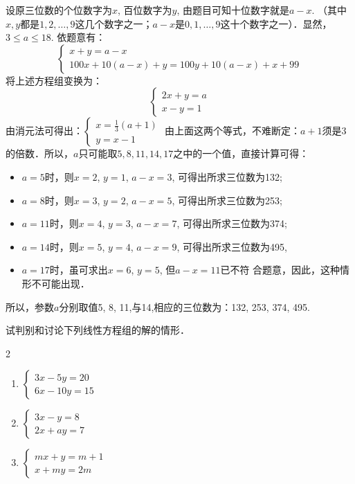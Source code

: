 \begin{solution}
设原三位数的个位数字为$x$, 百位数字为$y$, 由题目可知十位数字就是$a-x$. （其中$x,y$都是$1, 2,\ldots,9$这几个数字之一；$a-x$是$0, 1,\ldots,9$这十个数字之一）．显然，$3\le a\le 18$. 依题意有：
\[\begin{cases}
    x+y=a-x\\
    100x+10(a-x)+y=100y+10(a-x)+x+99
\end{cases}\]
将上述方程组变换为：
\[\begin{cases}
    2x+y=a\\x-y=1
\end{cases}\]
由消元法可得出：$\begin{cases}
    x=\frac{1}{3}(a+1)\\ y=x-1
\end{cases}$
由上面这两个等式，不难断定：$a+1$须是3的倍数．所以，$a$只可能取$5, 8, 11, 14, 17$之中的一个值，直接计算可得：
\begin{itemize}
    \item $a=5$时，则$x=2$, $y=1$, $a-x=3$,
    可得出所求三位数为132;
\item $a=8$时，则$x=3$, $y=2$, $a-x=5$,
可得出所求三位数为253;
\item $a=11$时，则$x=4$, $y=3$, $a-x=7$,
可得出所求三位数为374;
\item $a=14$时，则$x=5$, $y=4$, $a-x=9$,
可得出所求三位数为495,
\item $a=17$时，虽可求出$x=6$, $y=5$, 但$a-x=11$已不符
合题意，因此，这种情形不可能出现．
 \end{itemize}   

所以，参数$a$分别取值5, 8, 11,与14,相应的三位数为：132, 253, 374, 495.
\end{solution}    

\begin{ex}
    试判别和讨论下列线性方程组的解的情形．
    \begin{multicols}{2}
\begin{enumerate}
    \item $\begin{cases}
        3x-5y=20\\6x-10y=15
    \end{cases}$
    \item $\begin{cases}
        3x-y=8\\2x+ay=7
    \end{cases}$
    \item $\begin{cases}
mx+y=m+1\\x+my=2m        
    \end{cases}$
\end{enumerate}        
    \end{multicols}
\end{ex}

